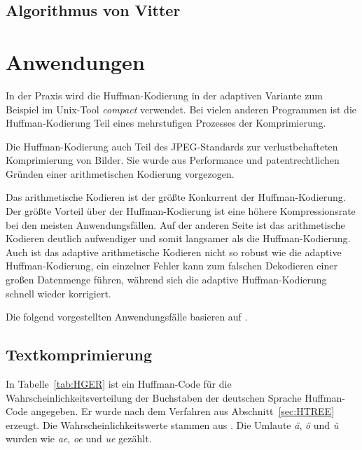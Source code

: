 \documentclass[twoside,11pt,a4paper]{article}
\theoremstyle{break}
\begin{document}

\subsection{Algorithmus von Vitter}

\section{Anwendungen}
In der Praxis wird die Huffman-Kodierung in der adaptiven Variante zum
Beispiel im Unix-Tool \emph{compact} verwendet. Bei vielen anderen
Programmen ist die Huffman-Kodierung Teil eines mehrstufigen Prozesses
der Komprimierung.

Die Huffman-Kodierung auch Teil des JPEG-Standards zur
verlustbehafteten Komprimierung von Bilder. Sie wurde aus Performance
und patentrechtlichen Gründen einer arithmetischen Kodierung
vorgezogen. \cite{Wallace:1991}

Das arithmetische Kodieren ist der größte Konkurrent der
Huffman-Kodierung. Der größte Vorteil über der Huffman-Kodierung ist
eine höhere Kompressionsrate bei den meisten Anwendungsfällen. Auf der
anderen Seite ist das arithmetische Kodieren deutlich aufwendiger und
somit langsamer als die Huffman-Kodierung. Auch ist das adaptive
arithmetische Kodieren nicht so robust wie die adaptive
Huffman-Kodierung, ein einzelner Fehler kann zum falschen Dekodieren
einer großen Datenmenge führen, während sich die adaptive
Huffman-Kodierung schnell wieder korrigiert. \cite{Bookstein:1993}






Die folgend vorgestellten Anwendungsfälle basieren auf \cite{Sayood:2006}.

\subsection{Textkomprimierung}

In Tabelle~\ref{tab:HGER} ist ein Huffman-Code für die
Wahrscheinlichkeitsverteilung der Buchstaben der deutschen Sprache
Huffman-Code angegeben. Er wurde nach dem Verfahren aus
Abschnitt~\ref{sec:HTREE} erzeugt. Die Wahrscheinlichkeitswerte
stammen aus \cite{Beutelspacher:2005}. Die Umlaute \emph{ä}, \emph{ö}
und \emph{ü} wurden wie \emph{ae}, \emph{oe} und \emph{ue} gezählt.
\end{document}
